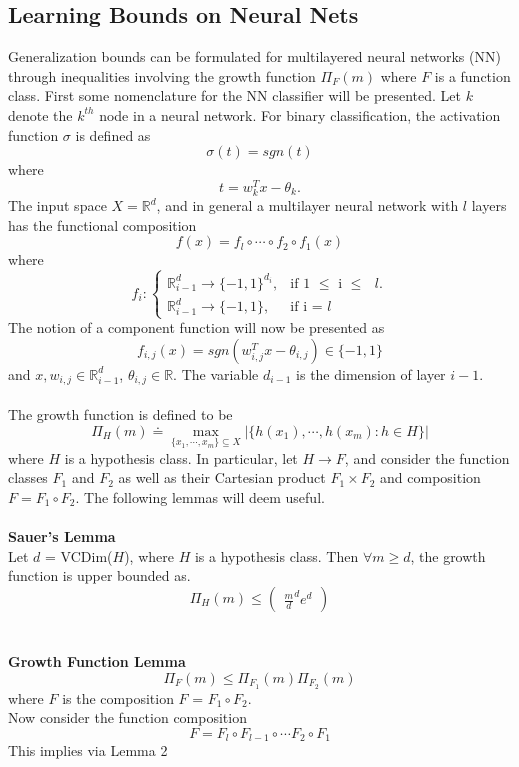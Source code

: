 \documentclass{article} %
\begin{document}
\subsection{Learning Bounds on Neural Nets}
Generalization bounds can be formulated for multilayered neural networks (NN) through inequalities involving the growth function $\Pi_F(m)$ where $F$ is a function class. First some nomenclature for the NN classifier will be presented. Let $k$ denote the $k^{th}$ node in a neural network. For binary classification, the activation function $\sigma$ is defined as
$$
\sigma(t) = sgn(t)
$$
where
$$
t = w_k^Tx - \theta_k.
$$
The input space $X = \mathbb{R}^d$, and in general a multilayer neural network with $l$ layers has the functional composition
$$
f(x) = f_l \circ \cdots \circ f_2 \circ f_1 (x)
$$
where
$$
f_i : \begin{cases}
    \mathbb{R}^d_{i-1} \rightarrow \{-1,1\}^{d_i}, & \text{if 1 $\leq$ i $\leq$ $l$}.\\
    \mathbb{R}^d_{i-1} \rightarrow \{-1,1\}, & \text{if i = $l$}
  \end{cases}
$$
The notion of a component function will now be presented as
$$
f_{i,j}(x) = sgn(w_{i,j}^Tx - \theta_{i,j}) \in \{-1,1\}
$$
and $x,w_{i,j} \in \mathbb{R}^d_{i-1}$, $\theta_{i,j} \in \mathbb{R}$. The variable $d_{i-1}$ is the dimension of layer $i-1$.
\\
\\
The growth function is defined to be
$$
\Pi_H(m) \doteq \max_{\{x_1,\cdots,x_m\} \subseteq X} |\{h(x_1),\cdots,h(x_m) : h \in H \} |
$$
where $H$ is a hypothesis class. In particular, let $H \rightarrow F$, and consider the function classes $F_1$ and $F_2$ as well as their Cartesian product $F_1 \times F_2$ and composition $F = F_1 \circ F_2$. The following lemmas will deem useful.
\\
\\
\textbf{Sauer's Lemma}
\\
Let $d$ = VCDim($H$), where $H$ is a hypothesis class. Then $\forall m \geq d$, the growth function is upper bounded as.
$$
\Pi_H(m) \leq \begin{pmatrix}
\frac{m}{d}^de^d
\end{pmatrix}
$$
\\
\\
\textbf{Growth Function Lemma}
$$
\Pi_F(m) \leq \Pi_{F_1}(m)\Pi_{F_2}(m)
$$
where $F$ is the composition $F$ = $F_1 \circ F_2$.
\\
Now consider the function composition
$$
F = F_l \circ F_{l-1} \circ \cdots F_2 \circ F_1
$$
This implies via Lemma 2
\end{document}
